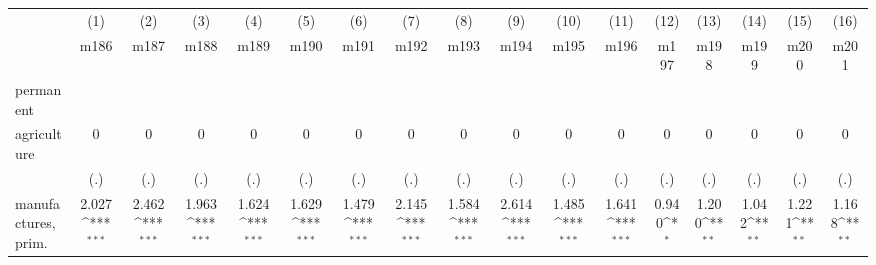 {
\def\sym#1{\ifmmode^{#1}\else\(^{#1}\)\fi}
\begin{tabular}{l*{16}{c}}
\hline\hline
                    &\multicolumn{1}{c}{(1)}&\multicolumn{1}{c}{(2)}&\multicolumn{1}{c}{(3)}&\multicolumn{1}{c}{(4)}&\multicolumn{1}{c}{(5)}&\multicolumn{1}{c}{(6)}&\multicolumn{1}{c}{(7)}&\multicolumn{1}{c}{(8)}&\multicolumn{1}{c}{(9)}&\multicolumn{1}{c}{(10)}&\multicolumn{1}{c}{(11)}&\multicolumn{1}{c}{(12)}&\multicolumn{1}{c}{(13)}&\multicolumn{1}{c}{(14)}&\multicolumn{1}{c}{(15)}&\multicolumn{1}{c}{(16)}\\
                    &\multicolumn{1}{c}{m186}&\multicolumn{1}{c}{m187}&\multicolumn{1}{c}{m188}&\multicolumn{1}{c}{m189}&\multicolumn{1}{c}{m190}&\multicolumn{1}{c}{m191}&\multicolumn{1}{c}{m192}&\multicolumn{1}{c}{m193}&\multicolumn{1}{c}{m194}&\multicolumn{1}{c}{m195}&\multicolumn{1}{c}{m196}&\multicolumn{1}{c}{m197}&\multicolumn{1}{c}{m198}&\multicolumn{1}{c}{m199}&\multicolumn{1}{c}{m200}&\multicolumn{1}{c}{m201}\\
\hline
permanent           &                     &                     &                     &                     &                     &                     &                     &                     &                     &                     &                     &                     &                     &                     &                     &                     \\
agriculture         &           0         &           0         &           0         &           0         &           0         &           0         &           0         &           0         &           0         &           0         &           0         &           0         &           0         &           0         &           0         &           0         \\
                    &         (.)         &         (.)         &         (.)         &         (.)         &         (.)         &         (.)         &         (.)         &         (.)         &         (.)         &         (.)         &         (.)         &         (.)         &         (.)         &         (.)         &         (.)         &         (.)         \\
[1em]
manufactures, prim. &       2.027\sym{***}&       2.462\sym{***}&       1.963\sym{***}&       1.624\sym{***}&       1.629\sym{***}&       1.479\sym{***}&       2.145\sym{***}&       1.584\sym{***}&       2.614\sym{***}&       1.485\sym{***}&       1.641\sym{***}&       0.940\sym{*}  &       1.200\sym{**} &       1.042\sym{**} &       1.221\sym{**} &       1.168\sym{**} \\

\end{tabular}}
